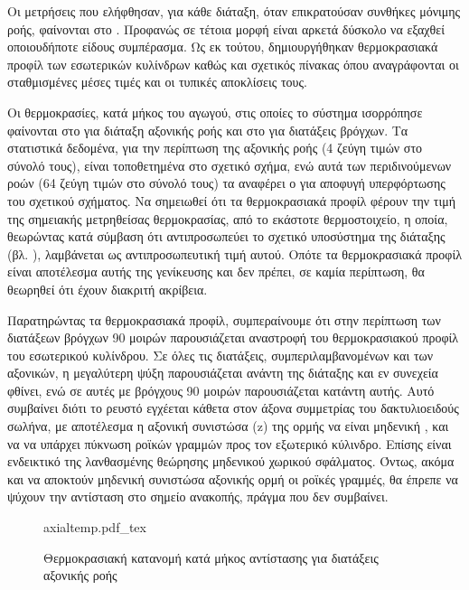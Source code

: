 \noindent Οι μετρήσεις που ελήφθησαν, για κάθε διάταξη, όταν επικρατούσαν συνθήκες μόνιμης ροής, φαίνονται στο . Προφανώς σε τέτοια μορφή είναι αρκετά δύσκολο να εξαχθεί οποιουδήποτε είδους συμπέρασμα. Ως εκ τούτου, δημιουργήθηκαν θερμοκρασιακά προφίλ των εσωτερικών κυλίνδρων καθώς και σχετικός πίνακας όπου αναγράφονται οι σταθμισμένες μέσες τιμές και οι τυπικές αποκλίσεις τους.

Οι θερμοκρασίες, κατά μήκος του αγωγού, στις οποίες το σύστημα ισορρόπησε φαίνονται στο  για διάταξη αξονικής ροής και στο  για διατάξεις βρόγχων. Τα στατιστικά δεδομένα, για την περίπτωση της αξονικής ροής (4 ζεύγη τιμών στο σύνολό τους), είναι τοποθετημένα στο σχετικό σχήμα, ενώ αυτά των περιδινούμενων ροών (64 ζεύγη τιμών στο σύνολό τους) τα αναφέρει ο  για αποφυγή υπερφόρτωσης του σχετικού σχήματος. Να σημειωθεί ότι τα θερμοκρασιακά προφίλ φέρουν την τιμή της σημειακής μετρηθείσας θερμοκρασίας, από το εκάστοτε θερμοστοιχείο, η οποία, θεωρώντας κατά σύμβαση ότι αντιπροσωπεύει το σχετικό υποσύστημα της διάταξης (βλ. ), λαμβάνεται ως αντιπροσωπευτική τιμή αυτού. Οπότε τα θερμοκρασιακά προφίλ είναι αποτέλεσμα αυτής της γενίκευσης και δεν πρέπει, σε καμία περίπτωση, θα θεωρηθεί ότι έχουν διακριτή ακρίβεια.

Παρατηρώντας τα θερμοκρασιακά προφίλ, συμπεραίνουμε ότι στην περίπτωση των διατάξεων βρόγχων 90 μοιρών παρουσιάζεται αναστροφή του θερμοκρασιακού προφίλ του εσωτερικού κυλίνδρου. Σε όλες τις διατάξεις, συμπεριλαμβανομένων και των αξονικών, η μεγαλύτερη ψύξη παρουσιάζεται ανάντη της διάταξης και εν συνεχεία φθίνει, ενώ σε αυτές με βρόγχους 90 μοιρών παρουσιάζεται κατάντη αυτής. Αυτό συμβαίνει διότι το ρευστό εγχέεται κάθετα στον άξονα συμμετρίας του δακτυλιοειδούς σωλήνα, με αποτέλεσμα η αξονική συνιστώσα (z) της ορμής να είναι μηδενική  \cite{1998_FariasNeto}, και να να υπάρχει πύκνωση ροϊκών γραμμών προς τον εξωτερικό κύλινδρο. Επίσης είναι ενδεικτικό της λανθασμένης θεώρησης μηδενικού χωρικού σφάλματος. Όντως, ακόμα και να αποκτούν μηδενική συνιστώσα αξονικής ορμή οι ροϊκές γραμμές, θα έπρεπε να ψύχουν την αντίσταση στο σημείο ανακοπής, πράγμα που δεν συμβαίνει.

\begin{figure}[htbp]
\centering
\scriptsize
\def\svgwidth{.47\linewidth}
{axialtemp.pdf_tex}
\caption{Θερμοκρασιακή κατανομή κατά μήκος αντίστασης για διατάξεις αξονικής ροής}
\label{fig:axialtemp}
\end{figure}

